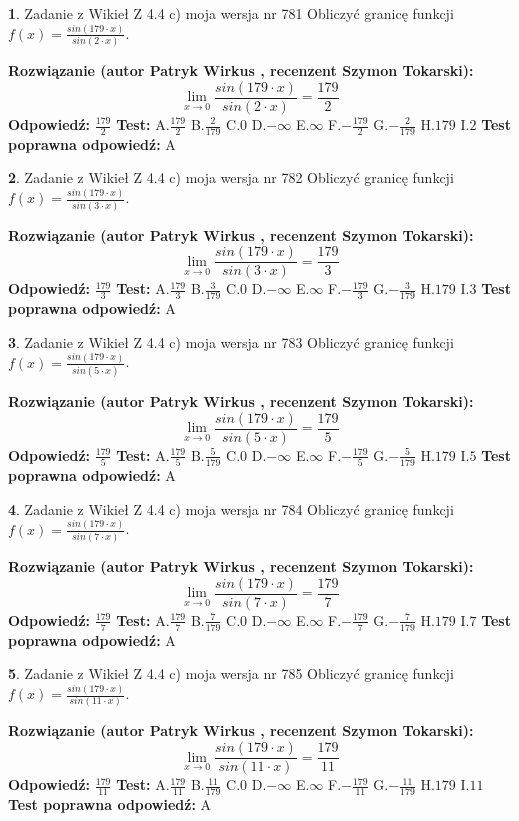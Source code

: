\documentclass[12pt, a4paper]{article}
\theoremstyle{definition} %
\newtheorem{zad}{}
\newcommand{\zadStart}[1]{\begin{zad}#1\newline}
\newcommand{\zadStop}{\end{zad}}
\newcommand{\rozwStart}[2]{\noindent \textbf{Rozwiązanie (autor #1 , recenzent #2): }\newline}
\newcommand{\rozwStop}{\newline}
\newcommand{\odpStart}{\noindent \textbf{Odpowiedź:}\newline}
\newcommand{\odpStop}{\newline}
\newcommand{\testStart}{\noindent \textbf{Test:}\newline}
\newcommand{\testStop}{\newline}
\newcommand{\kluczStart}{\noindent \textbf{Test poprawna odpowiedź:}\newline}
\newcommand{\kluczStop}{\newline}
\begin{document}
\zadStart{Zadanie z Wikieł Z 4.4 c) moja wersja nr 781}
Obliczyć granicę funkcji $f(x)=\frac{sin(179\cdot x)}{sin(2\cdot x)}$.
\zadStop
\rozwStart{Patryk Wirkus}{Szymon Tokarski}
$$\lim\limits_{x\to 0}\frac{sin(179\cdot x)}{sin(2\cdot x)}=
\frac{179}{2}$$
\rozwStop
\odpStart
$\frac{179}{2}$
\odpStop
\testStart
A.$\frac{179}{2}$
B.$\frac{2}{179}$
C.$0$
D.$-\infty$
E.$\infty$
F.$-\frac{179}{2}$
G.$-\frac{2}{179}$
H.$179$
I.$2$
\testStop
\kluczStart
A
\kluczStop



\zadStart{Zadanie z Wikieł Z 4.4 c) moja wersja nr 782}
Obliczyć granicę funkcji $f(x)=\frac{sin(179\cdot x)}{sin(3\cdot x)}$.
\zadStop
\rozwStart{Patryk Wirkus}{Szymon Tokarski}
$$\lim\limits_{x\to 0}\frac{sin(179\cdot x)}{sin(3\cdot x)}=
\frac{179}{3}$$
\rozwStop
\odpStart
$\frac{179}{3}$
\odpStop
\testStart
A.$\frac{179}{3}$
B.$\frac{3}{179}$
C.$0$
D.$-\infty$
E.$\infty$
F.$-\frac{179}{3}$
G.$-\frac{3}{179}$
H.$179$
I.$3$
\testStop
\kluczStart
A
\kluczStop



\zadStart{Zadanie z Wikieł Z 4.4 c) moja wersja nr 783}
Obliczyć granicę funkcji $f(x)=\frac{sin(179\cdot x)}{sin(5\cdot x)}$.
\zadStop
\rozwStart{Patryk Wirkus}{Szymon Tokarski}
$$\lim\limits_{x\to 0}\frac{sin(179\cdot x)}{sin(5\cdot x)}=
\frac{179}{5}$$
\rozwStop
\odpStart
$\frac{179}{5}$
\odpStop
\testStart
A.$\frac{179}{5}$
B.$\frac{5}{179}$
C.$0$
D.$-\infty$
E.$\infty$
F.$-\frac{179}{5}$
G.$-\frac{5}{179}$
H.$179$
I.$5$
\testStop
\kluczStart
A
\kluczStop



\zadStart{Zadanie z Wikieł Z 4.4 c) moja wersja nr 784}
Obliczyć granicę funkcji $f(x)=\frac{sin(179\cdot x)}{sin(7\cdot x)}$.
\zadStop
\rozwStart{Patryk Wirkus}{Szymon Tokarski}
$$\lim\limits_{x\to 0}\frac{sin(179\cdot x)}{sin(7\cdot x)}=
\frac{179}{7}$$
\rozwStop
\odpStart
$\frac{179}{7}$
\odpStop
\testStart
A.$\frac{179}{7}$
B.$\frac{7}{179}$
C.$0$
D.$-\infty$
E.$\infty$
F.$-\frac{179}{7}$
G.$-\frac{7}{179}$
H.$179$
I.$7$
\testStop
\kluczStart
A
\kluczStop



\zadStart{Zadanie z Wikieł Z 4.4 c) moja wersja nr 785}
Obliczyć granicę funkcji $f(x)=\frac{sin(179\cdot x)}{sin(11\cdot x)}$.
\zadStop
\rozwStart{Patryk Wirkus}{Szymon Tokarski}
$$\lim\limits_{x\to 0}\frac{sin(179\cdot x)}{sin(11\cdot x)}=
\frac{179}{11}$$
\rozwStop
\odpStart
$\frac{179}{11}$
\odpStop
\testStart
A.$\frac{179}{11}$
B.$\frac{11}{179}$
C.$0$
D.$-\infty$
E.$\infty$
F.$-\frac{179}{11}$
G.$-\frac{11}{179}$
H.$179$
I.$11$
\testStop
\kluczStart
A
\kluczStop
\end{document}
